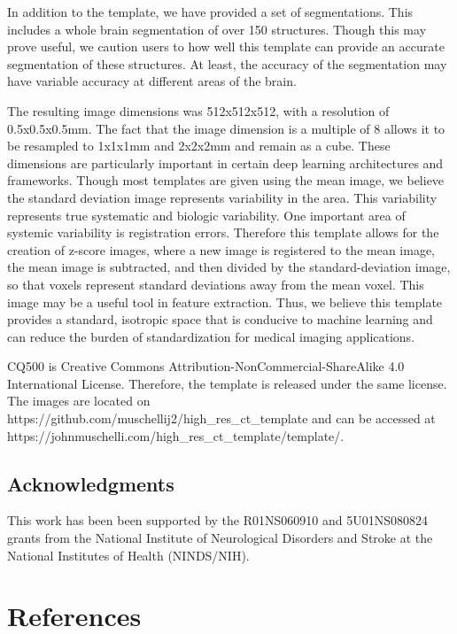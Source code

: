 \documentclass[]{elsarticle} %
\begin{document}
In addition to the template, we have provided a set of segmentations. This includes a whole brain segmentation of over 150 structures. Though this may prove useful, we caution users to how well this template can provide an accurate segmentation of these structures. At least, the accuracy of the segmentation may have variable accuracy at different areas of the brain.

The resulting image dimensions was 512x512x512, with a resolution of 0.5x0.5x0.5mm. The fact that the image dimension is a multiple of 8 allows it to be resampled to 1x1x1mm and 2x2x2mm and remain as a cube. These dimensions are particularly important in certain deep learning architectures and frameworks. Though most templates are given using the mean image, we believe the standard deviation image represents variability in the area. This variability represents true systematic and biologic variability. One important area of systemic variability is registration errors. Therefore this template allows for the creation of z-score images, where a new image is registered to the mean image, the mean image is subtracted, and then divided by the standard-deviation image, so that voxels represent standard deviations away from the mean voxel. This image may be a useful tool in feature extraction. Thus, we believe this template provides a standard, isotropic space that is conducive to machine learning and can reduce the burden of standardization for medical imaging applications.

CQ500 is Creative Commons Attribution-NonCommercial-ShareAlike 4.0 International License. Therefore, the template is released under the same license. The images are located on https://github.com/muschellij2/high\_res\_ct\_template and can be accessed at https://johnmuschelli.com/high\_res\_ct\_template/template/.

\hypertarget{acknowledgments}{%
\subsection{Acknowledgments}\label{acknowledgments}}

This work has been been supported by the R01NS060910 and 5U01NS080824 grants from the National Institute of Neurological Disorders and Stroke at the National Institutes of Health (NINDS/NIH).

\hypertarget{references}{%
\section*{References}\label{references}}
\end{document}
